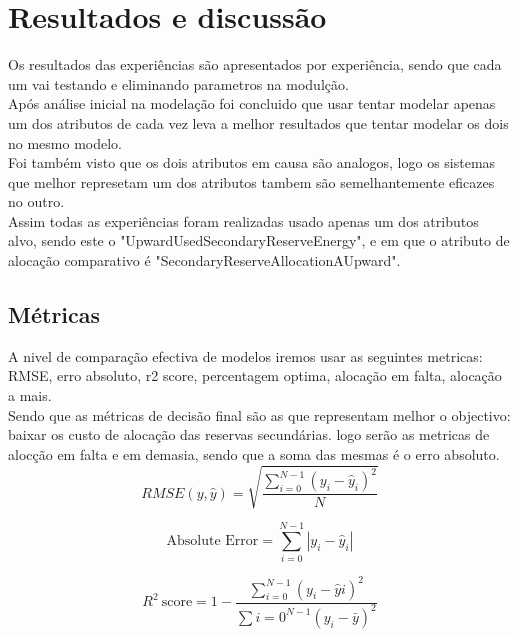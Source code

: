 \chapter{Resultados e discussão}

Os resultados das experiências são apresentados por experiência, sendo que cada um vai testando e eliminando parametros na modulção.\\
Após análise inicial na modelação foi concluido que usar tentar modelar apenas um dos atributos de cada vez leva a melhor resultados que tentar modelar os dois no mesmo modelo.\\
Foi também visto que os dois atributos em causa são analogos, logo os sistemas que melhor represetam um dos atributos tambem são semelhantemente eficazes no outro. \\
Assim todas as experiências foram realizadas usado apenas um dos atributos alvo, sendo este o "UpwardUsedSecondaryReserveEnergy", e em que o atributo de alocação comparativo é  "SecondaryReserveAllocationAUpward".\\

\section{Métricas\label{se:metricas}}

A nivel de comparação efectiva de modelos iremos usar as seguintes metricas: RMSE, erro absoluto, r2 score, percentagem optima, alocação em falta, alocação a mais.\\
Sendo que as métricas de decisão final são as que representam melhor o objectivo: baixar os custo de alocação das reservas secundárias. logo serão as metricas de alocção em falta e em demasia, sendo que a soma das mesmas é o erro absoluto.\\

\begin{equation}
\label{eq:rmse}
    RMSE (y, \hat{y}) = \sqrt{\frac{\sum_{i=0}^{N - 1} (y_i - \hat{y}_i)^2}{N}}
\end{equation}

\begin{equation} \label{eq:abse} 
    \text{Absolute\ Error} = \sum_{i=0}^{N - 1} \left| y_i - \hat{y}_i \right| 
\end{equation}

\begin{equation} \label{eq:r2score} R^2\ \text{score} = 1 - \frac{\sum_{i=0}^{N - 1} (y_i - \hat{y}i)^2}{\sum{i=0}^{N - 1} (y_i - \bar{y})^2} \end{equation}


